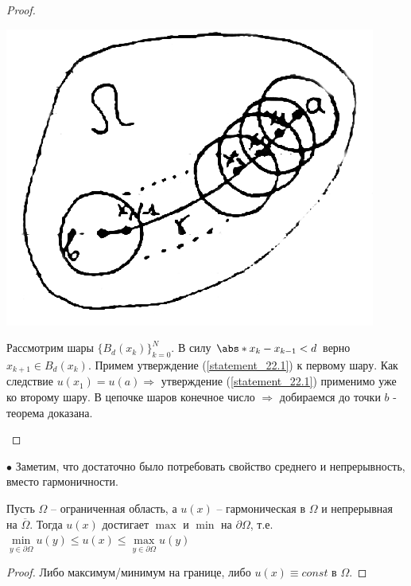 \begin{theorem}
\begin{proof}
\begin{itemize}
\begin{center}
 \includegraphics[scale=0.5]{22_3_new}
\end{center}
 Рассмотрим шары $\{B_d(x_k)\}_{k=0}^N$. В силу
 $\abs*{x_k - x_{k-1}}< d$ верно $x_{k+1} \in B_d(x_k)$. 
  Примем утверждение (\ref{statement_22.1}) к первому шару. 
  Как следствие $u(x_1) = u(a)\Rightarrow$ утверждение (\ref{statement_22.1}) применимо уже ко второму шару.
   В цепочке шаров конечное число 
  $\Rightarrow$ добираемся до точки $b$ - теорема доказана.  
\end{itemize}
\end{proof}
\end{theorem}

$\bullet$ Заметим, что достаточно было потребовать
свойство среднего и непрерывность, вместо гармоничности.


\begin{conseq}
\label{conseq22.1}
Пусть $\Omega$ -- ограниченная область, а $u(x)$ -- гармоническая в $\Omega$ и непрерывная на $\overline{\Omega}$.
Тогда $u(x)$ достигает $\max$ и $\min$ на $\partial \Omega$, т.е.
$\min\limits_{y \in \partial \Omega}u(y) \leq u(x) \leq \max\limits_{y \in \partial \Omega}u(y)$
	\begin{proof}
	Либо максимум/минимум на границе, либо $u(x)\equiv const$ в $\Omega$.
	\end{proof}
\end{conseq}



